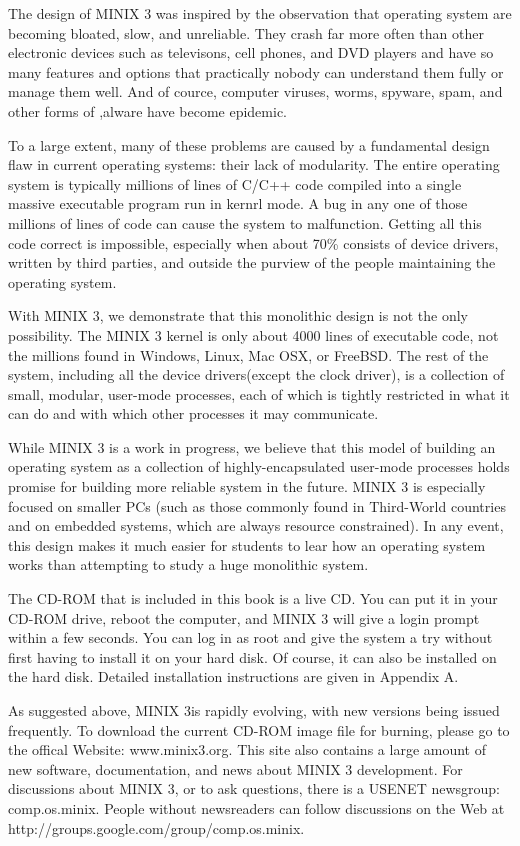 \documentclass{book}
\begin{document}
The design of MINIX 3 was inspired by the observation that operating system are becoming bloated, slow, and unreliable. 
They crash far more often than other electronic devices such as televisons, cell phones, and DVD players 
and have so many features and options that practically nobody can understand them fully or manage them well.
And of cource, computer viruses, worms, spyware, spam, and other forms of ,alware have become epidemic.

To a large extent, many of these problems are caused by a fundamental design flaw in current operating systems: their lack of modularity. 
The entire operating system is typically millions of lines of C/C++ code compiled into a single massive executable program run in kernrl mode.
A bug in any one of those millions of lines of code can cause the system to malfunction.
Getting all this code correct is impossible, especially when about 70\% consists of device drivers, written by third parties, 
and outside the purview of the people maintaining the operating system.

With MINIX 3, we demonstrate that this monolithic design is not the only possibility. 
The MINIX 3 kernel is only about 4000 lines of executable code, not the millions found in Windows, Linux, Mac OSX, or FreeBSD.
The rest of the system, including all the device drivers(except the clock driver), is a collection of small, modular, user-mode processes, 
each of which is tightly restricted in what it can do and with which other processes it may communicate.

While MINIX 3 is a work in progress, we believe that this model of building an operating system as a collection of highly-encapsulated user-mode 
processes holds promise for building more reliable system in the future.
MINIX 3 is especially focused on smaller PCs
(such as those commonly found in Third-World countries and on embedded systems, which are always resource constrained).
In any event, this design makes it much easier for students to lear how an operating system works than attempting to study a huge monolithic system.

The CD-ROM that is included in this book is a live CD. 
You can put it in your CD-ROM drive, reboot the computer, and MINIX 3 will give a login prompt within a few seconds. 
You can log in as root and give the system a try without first having to install it on your hard disk.
Of course, it can also be installed on the hard disk.
Detailed installation instructions are given in Appendix A.

As suggested above, MINIX 3is rapidly evolving, with new versions being issued frequently.
To download the current CD-ROM image file for burning, please go to the offical Website: www.minix3.org.
This site also contains a large amount of new software, documentation, and news about MINIX 3 development.
For discussions about MINIX 3, or to ask questions, there is a USENET newsgroup: comp.os.minix.
People without newsreaders can follow discussions on the Web at http://groups.google.com/group/comp.os.minix.
\end{document}
